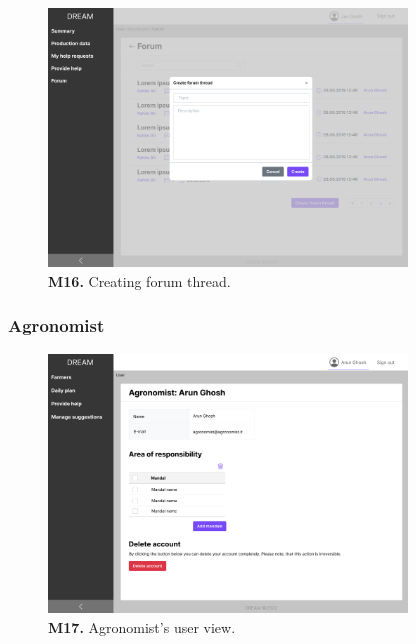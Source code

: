 \begin{figure}[H]
    \centering
    \includegraphics[width=0.85\textwidth]{mockups/Farmer_Dashboard_Forum_Create thread.png}
    \caption{\textbf{M16.} Creating forum thread.}
\end{figure}


\subsubsection{Agronomist}

\begin{figure}[H]
    \centering
    \includegraphics[width=0.85\textwidth]{mockups/Agronomist_User.png}
    \caption{\textbf{M17.} Agronomist's user view.}
\end{figure}

